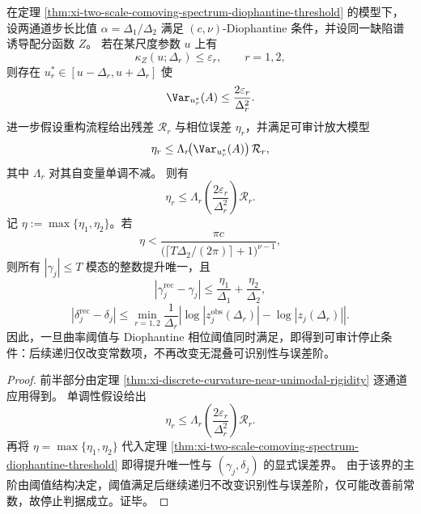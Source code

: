 \begin{theorem}[二尺度反混叠与离散曲率刚性的全链路停止证书]\label{thm:xi-two-scale-unaliasing-discrete-curvature-stop-certificate}
在定理 \ref{thm:xi-two-scale-comoving-spectrum-diophantine-threshold} 的模型下，设两通道步长比值 \(\alpha=\Delta_1/\Delta_2\) 满足 \((c,\nu)\)-Diophantine 条件，并设同一缺陷谱诱导配分函数 \(Z\)。
若在某尺度参数 \(u\) 上有
\[
\kappa_Z(u;\Delta_r)\le\varepsilon_r,\qquad r=1,2,
\]
则存在 \(u_r^\ast\in[u-\Delta_r,u+\Delta_r]\) 使
\[
\Var_{u_r^\ast}(A)\le\frac{2\varepsilon_r}{\Delta_r^2}.
\]
进一步假设重构流程给出残差 \(\mathcal R_r\) 与相位误差 \(\eta_r\)，并满足可审计放大模型
\[
\eta_r\le \Lambda_r\!\bigl(\Var_{u_r^\ast}(A)\bigr)\,\mathcal R_r,
\]
其中 \(\Lambda_r\) 对其自变量单调不减。
则有
\[
\eta_r\le
\Lambda_r\!\left(\frac{2\varepsilon_r}{\Delta_r^2}\right)\mathcal R_r.
\]
记 \(\eta:=\max\{\eta_1,\eta_2\}\)。若
\[
\eta<
\frac{\pi c}{
\bigl(\lceil T\Delta_2/(2\pi)\rceil+1\bigr)^{\nu-1}
},
\]
则所有 \(|\gamma_j|\le T\) 模态的整数提升唯一，且
\[
|\gamma_j^{\mathrm{rec}}-\gamma_j|
\le
\frac{\eta_1}{\Delta_1}+\frac{\eta_2}{\Delta_2},
\]
\[
|\delta_j^{\mathrm{rec}}-\delta_j|
\le
\min_{r=1,2}
\frac{1}{\Delta_r}
\left|
\log|z_j^{\mathrm{obs}}(\Delta_r)|-\log|z_j(\Delta_r)|
\right|.
\]
因此，一旦曲率阈值与 Diophantine 相位阈值同时满足，即得到可审计停止条件：后续递归仅改变常数项，不再改变无混叠可识别性与误差阶。
\end{theorem}
\begin{proof}
前半部分由定理 \ref{thm:xi-discrete-curvature-near-unimodal-rigidity} 逐通道应用得到。
单调性假设给出
\[
\eta_r\le
\Lambda_r\!\left(\frac{2\varepsilon_r}{\Delta_r^2}\right)\mathcal R_r.
\]
再将 \(\eta=\max\{\eta_1,\eta_2\}\) 代入定理 \ref{thm:xi-two-scale-comoving-spectrum-diophantine-threshold} 即得提升唯一性与 \((\gamma_j,\delta_j)\) 的显式误差界。
由于该界的主阶由阈值结构决定，阈值满足后继续递归不改变识别性与误差阶，仅可能改善前常数，故停止判据成立。证毕。
\end{proof}

\endinput

